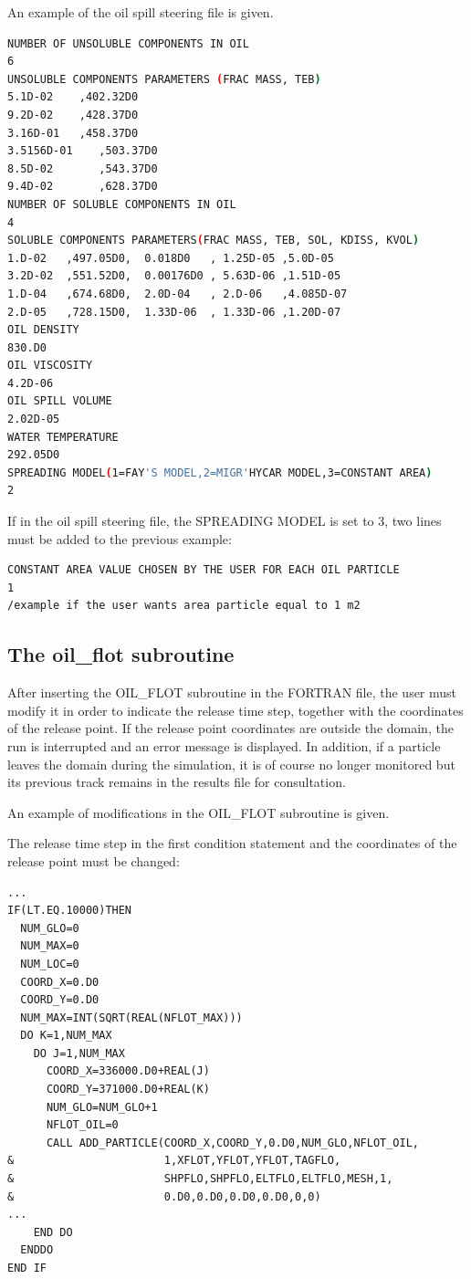 An example of the oil spill steering file is given.
\begin{lstlisting}[language=bash]
NUMBER OF UNSOLUBLE COMPONENTS IN OIL
6
UNSOLUBLE COMPONENTS PARAMETERS (FRAC MASS, TEB)
5.1D-02    ,402.32D0
9.2D-02    ,428.37D0
3.16D-01   ,458.37D0
3.5156D-01    ,503.37D0
8.5D-02       ,543.37D0
9.4D-02       ,628.37D0
NUMBER OF SOLUBLE COMPONENTS IN OIL
4
SOLUBLE COMPONENTS PARAMETERS(FRAC MASS, TEB, SOL, KDISS, KVOL)
1.D-02   ,497.05D0,  0.018D0   , 1.25D-05 ,5.0D-05
3.2D-02  ,551.52D0,  0.00176D0 , 5.63D-06 ,1.51D-05
1.D-04   ,674.68D0,  2.0D-04   , 2.D-06   ,4.085D-07
2.D-05   ,728.15D0,  1.33D-06  , 1.33D-06 ,1.20D-07
OIL DENSITY
830.D0
OIL VISCOSITY
4.2D-06
OIL SPILL VOLUME
2.02D-05
WATER TEMPERATURE
292.05D0
SPREADING MODEL(1=FAY'S MODEL,2=MIGR'HYCAR MODEL,3=CONSTANT AREA)
2
\end{lstlisting}
If in the oil spill steering file, the SPREADING MODEL is set to 3, two lines must be added to the previous example:
\begin{lstlisting}[language=bash]
CONSTANT AREA VALUE CHOSEN BY THE USER FOR EACH OIL PARTICLE
1
/example if the user wants area particle equal to 1 m2
\end{lstlisting}
\subsection{ The oil\_flot subroutine}

 After inserting the OIL\_FLOT subroutine in the FORTRAN file, the user must modify it in order to indicate the release time step, together with the coordinates of the release point. If the release point coordinates are outside the domain, the run is interrupted and an error message is displayed. In addition, if a particle leaves the domain during the simulation, it is of course no longer monitored but its previous track remains in the results file for consultation.

 An example of modifications in the OIL\_FLOT subroutine is given.

 The release time step in the first condition statement and the coordinates of the release point must be changed:
\begin{lstlisting}[language=TelFortran]
...
IF(LT.EQ.10000)THEN
  NUM_GLO=0
  NUM_MAX=0
  NUM_LOC=0
  COORD_X=0.D0
  COORD_Y=0.D0
  NUM_MAX=INT(SQRT(REAL(NFLOT_MAX)))
  DO K=1,NUM_MAX
    DO J=1,NUM_MAX
      COORD_X=336000.D0+REAL(J)
      COORD_Y=371000.D0+REAL(K)
      NUM_GLO=NUM_GLO+1
      NFLOT_OIL=0
      CALL ADD_PARTICLE(COORD_X,COORD_Y,0.D0,NUM_GLO,NFLOT_OIL,
&                       1,XFLOT,YFLOT,YFLOT,TAGFLO,
&                       SHPFLO,SHPFLO,ELTFLO,ELTFLO,MESH,1,
&                       0.D0,0.D0,0.D0,0.D0,0,0)
...
    END DO
  ENDDO
END IF
\end{lstlisting}

